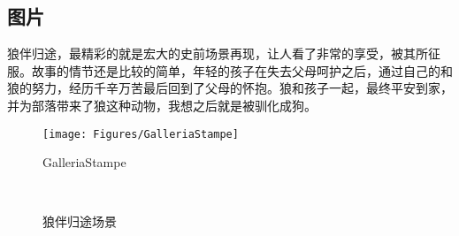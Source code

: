 \documentclass[
    UTF8,
    11pt,
    oneside,
    headinclude,
    footinclude
]{ctexart}
\begin{document}
\subsection{图片}
狼伴归途，最精彩的就是宏大的史前场景再现，让人看了非常的享受，被其所征服。故事的情节还是比较的简单，年轻的孩子在失去父母呵护之后，通过自己的和狼的努力，经历千辛万苦最后回到了父母的怀抱。狼和孩子一起，最终平安到家，并为部落带来了狼这种动物，我想之后就是被驯化成狗。
\begin{figure}[h]
    \centering
    \texttt{[image: Figures/GalleriaStampe]}   %
    \caption{GalleriaStampe}
    \label{woGalleriaStampelf}
\end{figure}

\begin{figure}[h]
    \centering
      \\
    \vspace{-0.3cm}
    \caption{狼伴归途场景}
    \label{wolf2}
\end{figure}
\end{document}
